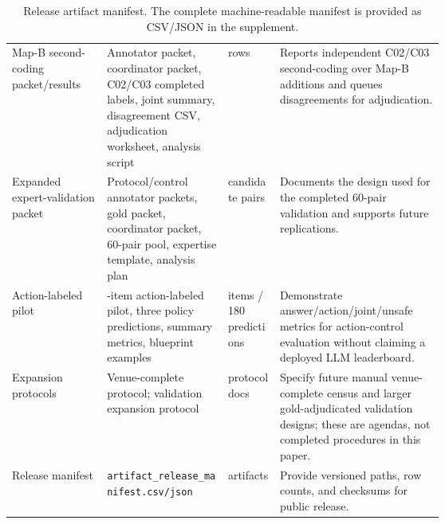 \documentclass[11pt]{article}
\begin{document}
\begin{table}[t]
\begin{tabularx}{\linewidth}{>{\raggedright\arraybackslash}p{0.22\linewidth}>{\raggedright\arraybackslash}p{0.29\linewidth}>{\raggedright\arraybackslash}p{0.12\linewidth}X}
Map-B second-coding packet/results & Annotator packet, coordinator packet, C02/C03 completed labels, joint summary, disagreement CSV, adjudication worksheet, analysis script & 148 rows & Reports independent C02/C03 second-coding over Map-B additions and queues disagreements for adjudication. \\
Expanded expert-validation packet & Protocol/control annotator packets, gold packet, coordinator packet, 60-pair pool, expertise template, analysis plan & 60 candidate pairs & Documents the design used for the completed 60-pair validation and supports future replications. \\
Action-labeled pilot & 60-item action-labeled pilot, three policy predictions, summary metrics, blueprint examples & 60 items / 180 predictions & Demonstrate answer/action/joint/unsafe metrics for action-control evaluation without claiming a deployed LLM leaderboard. \\
Expansion protocols & Venue-complete protocol; validation expansion protocol & protocol docs & Specify future manual venue-complete census and larger gold-adjudicated validation designs; these are agendas, not completed procedures in this paper. \\
Release manifest & \texttt{artifact\_release\_manifest.csv/json} & 303 artifacts & Provide versioned paths, row counts, and checksums for public release. \\
\bottomrule
\end{tabularx}
\caption{Release artifact manifest. The complete machine-readable manifest is provided as CSV/JSON in the supplement.}
\label{tab:artifact-release-manifest}
\end{table}

\end{document}

